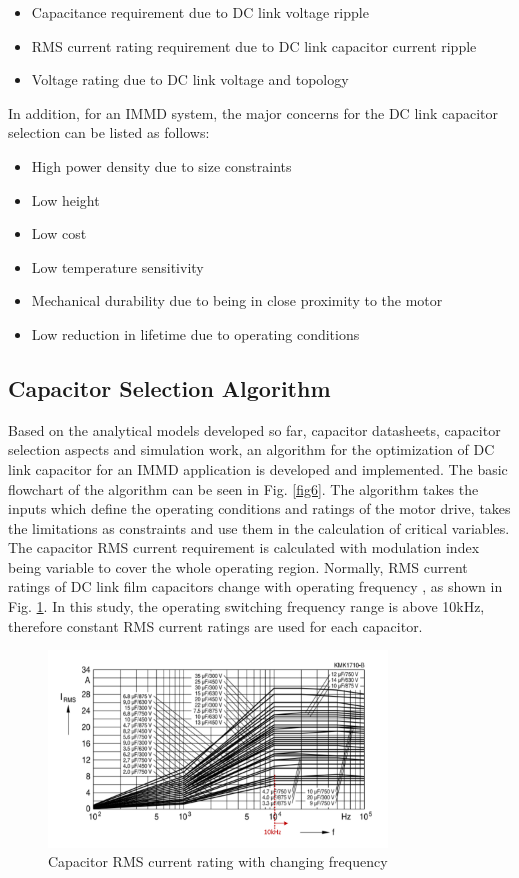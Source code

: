 \documentclass[conference,a4paper,twocolumn]{IEEEtran}
\begin{document}
\begin{itemize}
  \item Capacitance requirement due to DC link voltage ripple
  \item RMS current rating requirement due to DC link capacitor current ripple
  \item Voltage rating due to DC link voltage and topology
\end{itemize}

In addition, for an IMMD system, the major concerns for the DC link capacitor selection can be listed as follows:

\begin{itemize}
  \item High power density due to size constraints
  \item Low height
  \item Low cost
  \item Low temperature sensitivity
  \item Mechanical durability due to being in close proximity to the motor
  \item Low reduction in lifetime due to operating conditions
\end{itemize}


\subsection{Capacitor Selection Algorithm}

Based on the analytical models developed so far, capacitor datasheets, capacitor selection aspects and simulation work, an algorithm for the optimization of DC link capacitor for an IMMD application is developed and implemented. The basic flowchart of the algorithm can be seen in Fig. \ref{fig6}. The algorithm takes the inputs which define the operating conditions and ratings of the motor drive, takes the limitations as constraints and use them in the calculation of critical variables. The capacitor RMS current requirement is calculated with modulation index being variable to cover the whole operating region. Normally, RMS current ratings of DC link film capacitors change with operating frequency \cite{Polypropylene2009}, as shown in Fig. \ref{rms_f}. In this study, the operating switching frequency range is above 10kHz, therefore constant RMS current ratings are used for each capacitor.


\begin{figure}[h]
  \centering
  \includegraphics[width=9cm]{rms_f}
  \caption{Capacitor RMS current rating with changing frequency \cite{Polypropylene2009}}
  \label{rms_f}
\end{figure}
\end{document}
